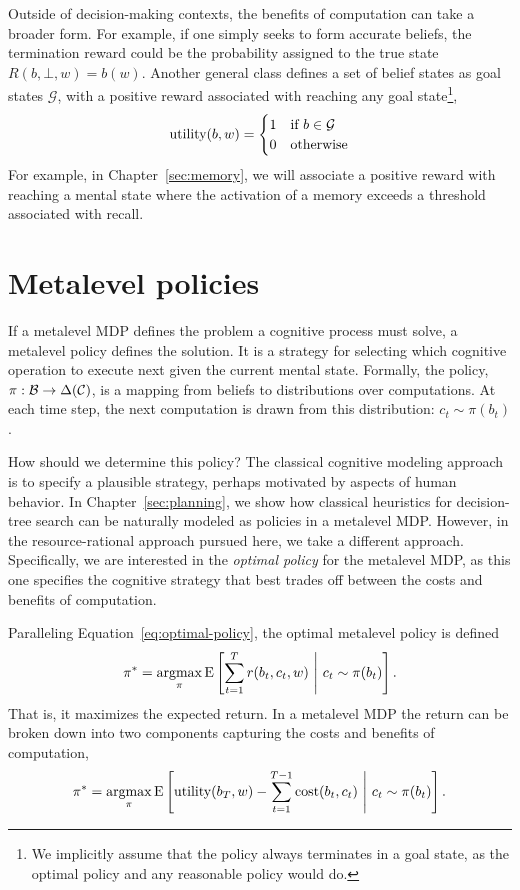 Outside of decision-making contexts, the benefits of computation can take a broader form. For example, if one simply seeks to form accurate beliefs, the termination reward could be the probability assigned to the true state $R(b, \bot, w) = b(w)$. Another general class defines a set of belief states as goal states $\mathcal{G}$, with a positive reward associated with reaching any goal state\footnote{We implicitly assume that the policy always terminates in a goal state, as the optimal policy and any reasonable policy would do.},
%
\begin{equation}\label{eq:goal-term}
  \text{utility}(b, w) = \begin{cases}
    1 &\text{if } b \in \mathcal{G} \\
    0 &\text{otherwise}
  \end{cases}
\end{equation}
%
For example, in Chapter~\ref{sec:memory}, we will associate a positive reward with reaching a mental state where the activation of a memory exceeds a threshold associated with recall.

\section{Metalevel policies}\label{sec:metamdp-policy}

If a metalevel MDP defines the problem a cognitive process must solve, a metalevel policy defines the solution. It is a strategy for selecting which cognitive operation to execute next given the current mental state. Formally, the policy, $\pi: \mathcal{B} \rightarrow \Delta(\mathcal{C})$, is a mapping from beliefs to distributions over computations. At each time step, the next computation is drawn from this distribution: $c_t \sim \pi(b_t)$.

How should we determine this policy? The classical cognitive modeling approach is to specify a plausible strategy, perhaps motivated by aspects of human behavior. In Chapter~\ref{sec:planning}, we show how classical heuristics for decision-tree search can be naturally modeled as policies in a metalevel MDP. However, in the resource-rational approach pursued here, we take a different approach. Specifically, we are interested in the \emph{optimal policy} for the metalevel MDP, as this one specifies the cognitive strategy that best trades off between the costs and benefits of computation. 

Paralleling Equation~\ref{eq:optimal-policy}, the optimal metalevel policy is defined
%
\begin{equation}\label{eq:optimal-meta-policy}
  \pi^* = \operatorname*{argmax}_\pi \operatorname*{E} \left[ 
    \sum_{t=1}^T r(b_t, c_t, w)
   \ \middle\vert\ 
    c_t \sim \pi(b_t)
   \right].
\end{equation}
That is, it maximizes the expected return. In a metalevel MDP the return can be broken down into two components capturing the costs and benefits of computation,
\begin{equation}
  \pi^* = \operatorname*{argmax}_\pi \operatorname*{E} \left[ 
    \text{utility}(b_T, w) - \sum_{t=1}^{T-1} \text{cost}(b_t, c_t)
   \ \middle\vert\ 
    c_t \sim \pi(b_t)
   \right].
\end{equation}

